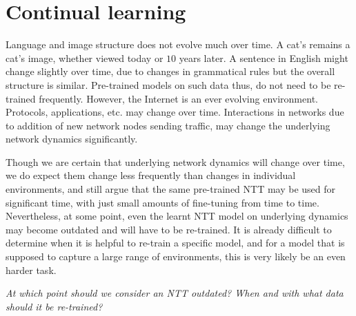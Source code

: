 \section{Continual learning}
\label{sec:cont}

Language and image structure does not evolve much over time. A cat's remains a cat's image, whether viewed today or $10$ years later. A sentence in English might change slightly over time, due to changes in grammatical rules but the overall structure is similar. Pre-trained models on such data thus, do not need to be re-trained frequently. However, the Internet is an ever evolving environment. Protocols, applications, etc. may change over time. Interactions in networks due to addition of new network nodes sending traffic, may change the underlying network dynamics significantly.

Though we are certain that underlying network dynamics will change over time, we do expect them change less frequently than changes in individual environments, and still argue that the same pre-trained NTT may be used for significant time, with just small amounts of fine-tuning from time to time. Nevertheless, at some point, even the learnt NTT model on underlying dynamics may become outdated and will have to be re-trained. It is already difficult to determine when it is helpful to re-train a specific model\cite{puffer}, and for a model that is supposed to capture a large range of environments, this is very likely be an even harder task.

\emph{At which point should we consider an NTT outdated? When and with what data should it be re-trained?}




